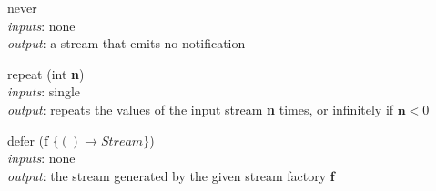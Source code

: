 \documentclass{dithesis}
\begin{document}
\begin{description}
\hfill
\begin{minipage}[c]{\rrr}

\end{minipage}
\newline \newline \newline
\begin{minipage}[c]{\lll}
\item[never] ~\\ 
	\textit{inputs}: none \\
	\textit{output}: a stream that emits no notification \\
\end{minipage}
\hfill
\begin{minipage}[c]{\rrr}

\end{minipage}
\newline \newline \newline
\begin{minipage}[c]{\lll}
\item[repeat](int \textbf{n}) \\ 
	\textit{inputs}: single \\
	\textit{output}: repeats the values of the input stream \textbf{n} times, or infinitely if $\textbf{n} < 0$ \\
\end{minipage}
\hfill
\begin{minipage}[c]{\rrr}

\end{minipage}
\newline \newline \newline
\begin{minipage}[c]{\lll}
\item[defer](\textbf{f} $\{ () \to Stream \}$) \\ 
	\textit{inputs}: none \\
	\textit{output}: the stream generated by the given stream factory \textbf{f}\\
\end{minipage}
\newline \newline \newline
\end{description}
\end{document}
